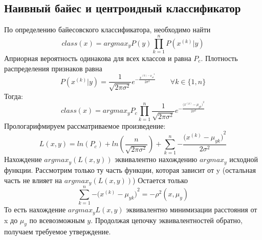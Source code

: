 \documentclass[12pt]{article}
\begin{document}
\subsection*{Наивный байес и центроидный классификатор}

По определению байесовского классификатора,
необходимо найти $$class(x) =
argmax_y {P(y)\prod_{k=1}^n}P(x^{(k)}|y)$$
Априорная вероятность одинакова для всех классов и равна $P_c$.
Плотность распределения признаков равна
$$P(x^{(k)}|y) = \frac{1}{\sqrt{2 \pi \sigma^2}}
e^{-\frac{x^{(k) - \mu_{yk}}^2}{2\sigma^2}}
\qquad \forall k \in \{ 1, n\}$$
Тогда:
$$ class(x) = argmax_y {P_c
\prod_{k=1}^n}\frac{1}{\sqrt{2 \pi \sigma^2}}
e^{-\frac {({x^{(k)} - \mu_{yk})}^2}{2\sigma^2}} $$
Прологарифмируем рассматриваемое произведение:
$$ L(x, y) = ln(P_c) + ln(\frac{n}{\sqrt{2 \pi \sigma^2}})
+ \sum_{k=1}^n {-\frac {({x^{(k)} - \mu_{yk})}^2}{2\sigma^2}} $$
Нахождение $argmax_y(L(x, y))$ эквивалентно нахождению
$argmax_y$ исходной функции.
Рассмотрим только ту часть функции, которая зависит от y
(остальная часть не влияет на $argmax_y(L(x, y))$)
Остается только
$$ \sum_{k=1}^n {-{(x^{(k)} - \mu_{yk}})}^2 = -\rho^2(x, \mu_y) $$
То есть нахождение $argmax_yL(x,y)$ эквивалентно минимизации расстояния от x до $\mu_y$ по всевозможным $y$. Продолжая цепочку эквивалентностей обратно, получаем требуемое утверждение.
\end{document}
